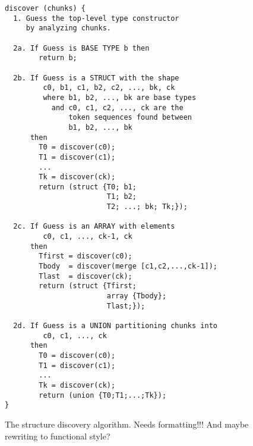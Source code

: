 \begin{figure}
\begin{small}
\begin{verbatim}
discover (chunks) {
  1. Guess the top-level type constructor 
     by analyzing chunks.

  2a. If Guess is BASE TYPE b then  
        return b;

  2b. If Guess is a STRUCT with the shape 
         c0, b1, c1, b2, c2, ..., bk, ck 
         where b1, b2, ..., bk are base types
           and c0, c1, c2, ..., ck are the 
               token sequences found between 
               b1, b2, ..., bk   
      then
        T0 = discover(c0);
        T1 = discover(c1);
        ...
        Tk = discover(ck);
        return (struct {T0; b1; 
                        T1; b2; 
                        T2; ...; bk; Tk;});

  2c. If Guess is an ARRAY with elements
         c0, c1, ..., ck-1, ck
      then
        Tfirst = discover(c0);
        Tbody  = discover(merge [c1,c2,...,ck-1]);
        Tlast  = discover(ck);
        return (struct {Tfirst; 
                        array {Tbody}; 
                        Tlast;});

  2d. If Guess is a UNION partitioning chunks into 
         c0, c1, ..., ck
      then
        T0 = discover(c0);
        T1 = discover(c1);
        ...
        Tk = discover(ck);
        return (union {T0;T1;...;Tk});
}
\end{verbatim}
\end{small}
\caption{The structure discovery algorithm. Needs formatting!!!
         And maybe rewriting to functional style?}
\label{fig:structure-discovery}
\end{figure}
